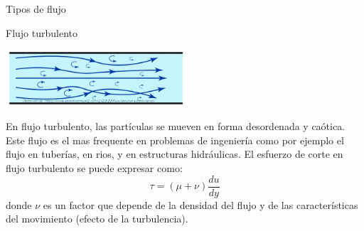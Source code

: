 \documentclass [xcolor=svgnames, t] {beamer}
\begin{document}
\begin{frame}{Tipos de flujo}
\vspace{-0.3cm}
\begin{block}{Flujo turbulento}
\begin{center}
\includegraphics[width=0.5\textwidth]{ftur}
\end{center}
En flujo turbulento, las part\'iculas se mueven en forma desordenada y ca\'otica. Este flujo es el mas frequente en problemas de ingenier\'ia como por ejemplo el flujo en tuber\'ias, en rios, y en estructuras hidr\'aulicas. El esfuerzo de corte en flujo turbulento se puede expresar como:
$$
\tau = (\mu + \nu)\frac{du}{dy}
$$
donde $\nu$ es un factor que depende de la densidad del flujo y de las caracter\'isticas del movimiento (efecto de la turbulencia).
\end{block}
\end{frame}
\end{document}
